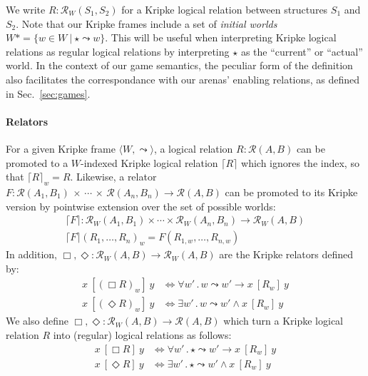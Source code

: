 \documentclass[sigplan,10pt,review,anonymous]{acmart}
\newcommand{\ifr}[1]{\ [{#1}]\ }
\begin{document}
We write $R : \mathcal{R}_W(S_1, S_2)$
for a Kripke logical relation between structures $S_1$ and $S_2$.
Note that our Kripke frames
include a set of \emph{initial worlds}
$W* = \{ w \in W \ |\  \star \leadsto w \}$.
This will be useful when interpreting Kripke logical relations
as regular logical relations
by interpreting $\star$ as the ``current'' or ``actual'' world.
In the context of our game semantics,
the peculiar form of the definition
also facilitates the correspondance with
our arenas' enabling relations,
as defined in Sec.~\ref{sec:games}.

\paragraph{Relators}

For a given Kripke frame $\langle W, \leadsto \rangle$,
a logical relation $R : \mathcal{R}(A, B)$
can be promoted to a $W$-indexed Kripke logical relation $\lceil R \rceil$
which ignores the index, so that $\lceil R \rceil_w = R$.
Likewise,
a relator
  $F : \mathcal{R}(A_1, B_1) \,\times\,\cdots\,\times\,\mathcal{R}(A_n, B_n) \rightarrow \mathcal{R}(A, B)$
can be promoted to its Kripke version
by pointwise extension over the set of possible worlds:
\begin{gather*}
  \lceil F \rceil : \mathcal{R}_W(A_1, B_1) \times \cdots \times \mathcal{R}_W(A_n, B_n) \rightarrow \mathcal{R}_W(A, B) \\
  \lceil F \rceil (R_1, \ldots, R_n)_w = F(R_{1,w}, \ldots, R_{n,w})
\end{gather*}
In addition,
$\Box, \Diamond : \mathcal{R}_W(A,B) \rightarrow \mathcal{R}_W(A,B)$
are the Kripke relators defined by:
\begin{align*}
  x \ifr{(\Box R)_w} y &\Leftrightarrow
    \forall w' \,.\, w \leadsto w' \rightarrow x \ifr{R_w} y \\
  x \ifr{(\Diamond R)_w} y &\Leftrightarrow
    \exists w' \,.\, w \leadsto w' \wedge x \ifr{R_w} y
\end{align*}
We also define
$\Box, \Diamond : \mathcal{R}_W(A,B) \rightarrow \mathcal{R}(A,B)$
which turn a Kripke logical relation $R$
into (regular) logical relations as follows:
\begin{align*}
  x \ifr{\Box R} y &\Leftrightarrow
    \forall w' \,.\, \star \leadsto w' \rightarrow x \ifr{R_w} y \\
  x \ifr{\Diamond R} y &\Leftrightarrow
    \exists w' \,.\, \star \leadsto w' \wedge x \ifr{R_w} y
\end{align*}
\end{document}
